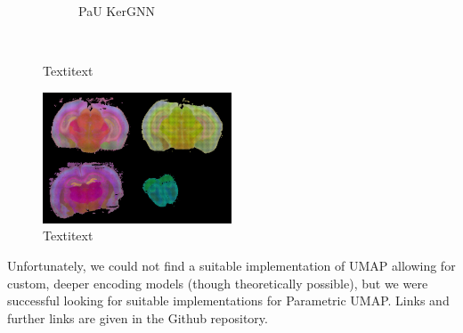 \documentclass[]{article}
\begin{document}
\begin{figure}
\begin{subfigure}{.176\textwidth}
		\caption{PaU KerGNN}
		\label{fig:ParaUMAP_KerGNN_sag}
	\end{subfigure}\\

	\caption{Textitext}
	\label{fig:dim_red_vis}
\end{figure}


\begin{figure}
	\centering
	
	\includegraphics[width=0.5\textwidth]{figures/graphiss_anlaysis.jpg}
	
	\caption{Textitext}
	\label{fig:baseline_vis}
\end{figure}



Unfortunately, we could not find a suitable implementation of UMAP allowing for custom, deeper encoding models (though theoretically possible), but we were successful looking for suitable implementations for Parametric UMAP. Links and further links are given in the Github repository. \\
\end{document}
